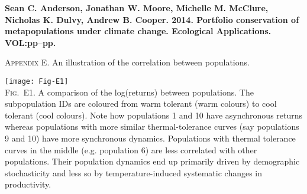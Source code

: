 \documentclass[12pt]{article}
\begin{document}
\textbf{Sean C. Anderson, Jonathan W. Moore, Michelle M. McClure, Nicholas K. Dulvy, Andrew B. Cooper. 2014. Portfolio conservation of metapopulations under climate change. Ecological Applications. VOL:pp--pp.}

\bigskip

\textsc{Appendix E.} An illustration of the correlation between populations.

\bigskip

\texttt{[image: Fig-E1]}\\
\textsc{Fig.~E1.} A comparison of the log(returns) between populations. The subpopulation IDs are coloured from warm tolerant (warm colours) to cool tolerant (cool colours). Note how populations 1 and 10 have asynchronous returns whereas populations with more similar thermal-tolerance curves (say populations 9 and 10) have more synchronous dynamics. Populations with thermal tolerance curves in the middle (e.g. population 6) are less correlated with other populations. Their population dynamics end up primarily driven by demographic stochasticity and less so by temperature-induced systematic changes in productivity.
\end{document}
